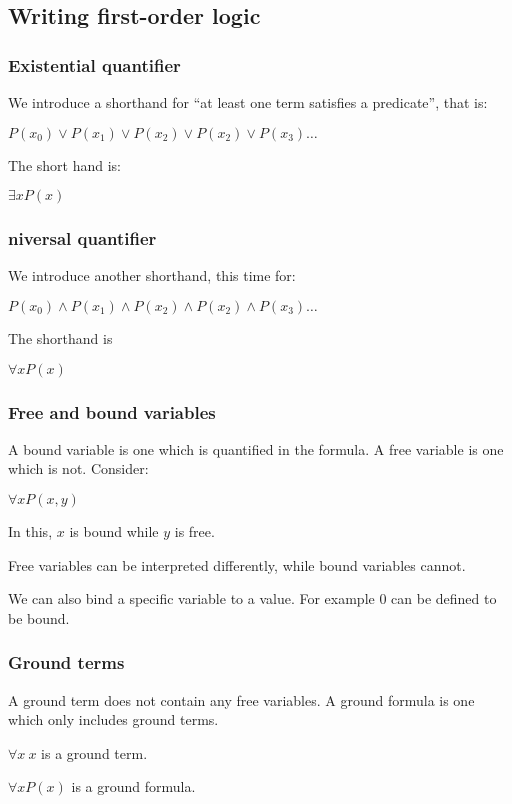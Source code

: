 
\subsection{Writing first-order logic}

\subsubsection{Existential quantifier}

We introduce a shorthand for “at least one term satisfies a predicate”, that is:

$P(x_0)\lor P(x_1)\lor P(x_2)\lor P(x_2)\lor P(x_3)…$

The short hand is:

$\exists x P(x)$

\subsubsection{niversal quantifier}

We introduce another shorthand, this time for:

$P(x_0)\land P(x_1)\land P(x_2)\land P(x_2)\land P(x_3)…$

The shorthand is

$\forall x P(x)$

\subsubsection{Free and bound variables}

A bound variable is one which is quantified in the formula. A free variable is one which is not. Consider:

$\forall x P(x,y)$

In this, \(x\) is bound while \(y\) is free.

Free variables can be interpreted differently, while bound variables cannot.

We can also bind a specific variable to a value. For example \(0\) can be defined to be bound.

\subsubsection{Ground terms}

A ground term does not contain any free variables. A ground formula is one which only includes ground terms.

\(\forall x\ x\) is a ground term.

\(\forall x P(x)\) is a ground formula.

